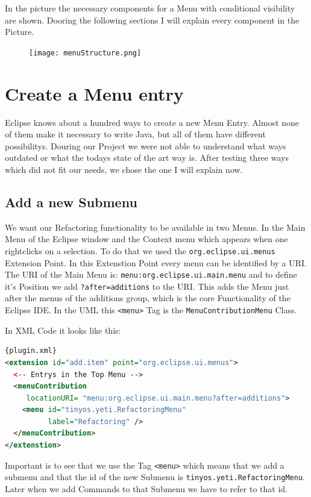 \documentclass[a4paper,10pt]{report}
\begin{document}
In the picture the necessary components for a Menu with conditional visibility are shown. Dooring the following sections I will explain every component in the Picture.
\begin{figure}[h]
\centering
\texttt{[image: menuStructure.png]}
\end{figure}

\section{Create a Menu entry}
Eclipse knows about a hundred ways to create a new Menu Entry. Almost none of them make it necessary to write Java, but all of them have different possibilitys. 
Douring our Project we were not able to understand what ways outdated or what the todays state of the art way is. After testing three ways which did not fit our needs,
we chose the one I will explain now. 

\subsection{Add a new Submenu}
We want our Refactoring functionality to be available in two Menus. In the Main Menu of the Eclipse window and the Context menu which appears when one rightclicks on
a selection. To do that we used the \verb!org.eclipse.ui.menus! Extension Point. In this Extenstion Point every menu can be identified by a URI. The URI of the Main Menu is:
\verb!menu:org.eclipse.ui.main.menu! and to define it's Position we add \verb!?after=additions! to the URI. This adds the Menu just after the menus of the additions group, 
which is the core Functionality of the Eclipse IDE. In the UML this \verb!<menu>! Tag is the \verb!MenuContributionMenu! Class.

In XML Code it looks like this:
\begin{lstlisting}[language=XML,caption=Create Menu Folder ({\it plugin.xml})]{plugin.xml}
<extension id="add.item" point="org.eclipse.ui.menus">
  <-- Entrys in the Top Menu -->
  <menuContribution
     locationURI= "menu:org.eclipse.ui.main.menu?after=additions">
    <menu id="tinyos.yeti.RefactoringMenu"
          label="Refactoring" />
  </menuContribution>
</extenstion>
\end{lstlisting}
Important is to see that we use the Tag \verb!<menu>! which means that we add a submenu and that the id of the new Submenu is \verb!tinyos.yeti.RefactoringMenu!. 
Later when we add Commands to that Submenu we have to refer to that id.
\end{document}

